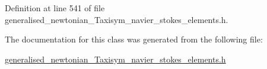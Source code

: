 Definition at line 541 of file generalised\+\_\+newtonian\+\_\+\+Taxisym\+\_\+navier\+\_\+stokes\+\_\+elements.\+h.



The documentation for this class was generated from the following file\+:\begin{DoxyCompactItemize}
\item 
\hyperlink{generalised__newtonian__Taxisym__navier__stokes__elements_8h}{generalised\+\_\+newtonian\+\_\+\+Taxisym\+\_\+navier\+\_\+stokes\+\_\+elements.\+h}\end{DoxyCompactItemize}
